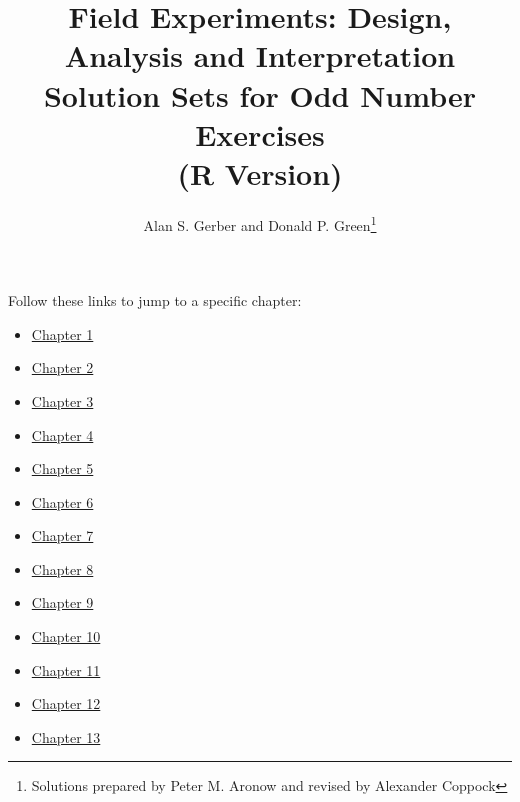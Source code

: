 \documentclass[11pt,notitlepage]{article}\usepackage[]{graphicx}\usepackage[]{color}
\begin{document}
\title{Field Experiments: Design, Analysis and Interpretation \\
Solution Sets for Odd Number Exercises\\(R Version)}
\author{Alan S. Gerber and Donald P. Green\footnote{Solutions prepared by Peter M. Aronow and revised by Alexander Coppock}}
\date{\vspace{-5ex}}

\maketitle
Follow these links to jump to a specific chapter:
\begin{itemize}
\item \hyperlink{page.2}{Chapter 1}
\item \hyperlink{page.4}{Chapter 2}
\item \hyperlink{page.10}{Chapter 3}
\item \hyperlink{page.21}{Chapter 4}
\item \hyperlink{page.31}{Chapter 5}
\item \hyperlink{page.40}{Chapter 6}
\item \hyperlink{page.45}{Chapter 7}
\item \hyperlink{page.50}{Chapter 8}
\item \hyperlink{page.60}{Chapter 9}
\item \hyperlink{page.71}{Chapter 10}
\item \hyperlink{page.81}{Chapter 11}
\item \hyperlink{page.87}{Chapter 12}
\item \hyperlink{page.101}{Chapter 13}
\end{itemize}

















\end{document}
